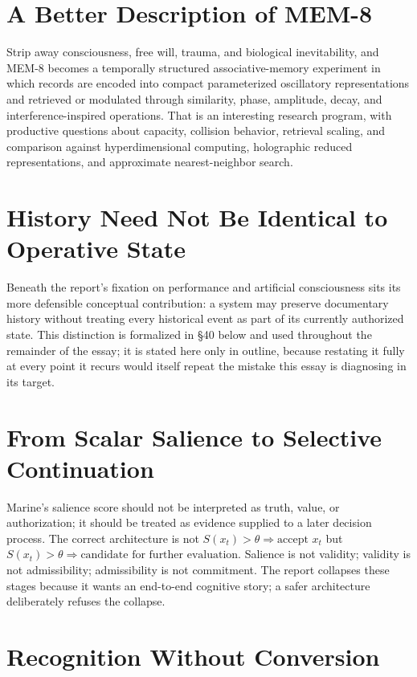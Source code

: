 \documentclass[12pt]{article}
\begin{document}
\section{A Better Description of MEM-8}

Strip away consciousness, free will, trauma, and biological inevitability, and MEM-8 becomes a temporally structured associative-memory experiment in which records are encoded into compact parameterized oscillatory representations and retrieved or modulated through similarity, phase, amplitude, decay, and interference-inspired operations. That is an interesting research program, with productive questions about capacity, collision behavior, retrieval scaling, and comparison against hyperdimensional computing, holographic reduced representations, and approximate nearest-neighbor search.

\section{History Need Not Be Identical to Operative State}

Beneath the report's fixation on performance and artificial consciousness sits its more defensible conceptual contribution: a system may preserve documentary history without treating every historical event as part of its currently authorized state. This distinction is formalized in \S40 below and used throughout the remainder of the essay; it is stated here only in outline, because restating it fully at every point it recurs would itself repeat the mistake this essay is diagnosing in its target.

\section{From Scalar Salience to Selective Continuation}

Marine's salience score should not be interpreted as truth, value, or authorization; it should be treated as evidence supplied to a later decision process. The correct architecture is not $S(x_t)>\theta\Rightarrow\text{accept }x_t$ but $S(x_t)>\theta\Rightarrow\text{candidate for further evaluation}$. Salience is not validity; validity is not admissibility; admissibility is not commitment. The report collapses these stages because it wants an end-to-end cognitive story; a safer architecture deliberately refuses the collapse.

\section{Recognition Without Conversion}
\end{document}
